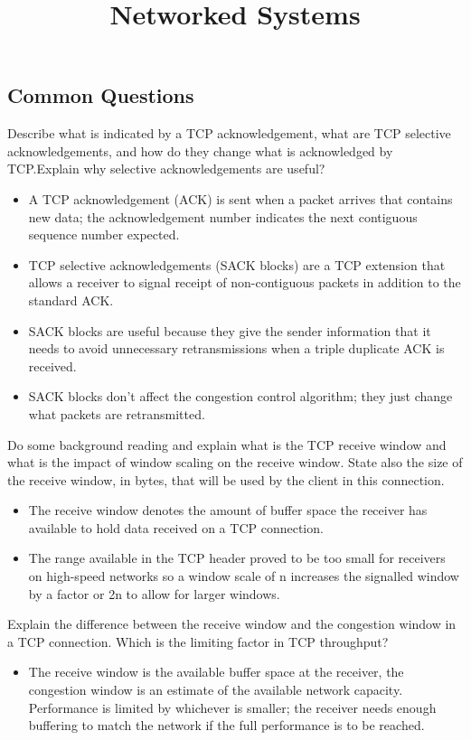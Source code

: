 \documentclass{article}
\title{Networked Systems}
\author{}
\date{}
\begin{document}
\footnotesize

\subsection*{Common Questions}
Describe what is indicated by a TCP acknowledgement, what are TCP selective acknowledgements, and how do they change what is acknowledged by TCP.\@ Explain why selective acknowledgements are useful?
\begin{itemize}
    \item A TCP acknowledgement (ACK) is sent when a packet arrives that contains new data; the acknowledgement number indicates the next contiguous sequence number expected.
    \item TCP selective acknowledgements (SACK blocks) are a TCP extension that allows a receiver to signal receipt of non-contiguous packets in addition to the standard ACK.\@
    \item SACK blocks are useful because they give the sender information that it needs to avoid unnecessary retransmissions when a triple duplicate ACK is received.
    \item SACK blocks don’t affect the congestion control algorithm; they just change what packets are retransmitted.
\end{itemize}

\noindent Do some background reading and explain what is the TCP receive window and what is the impact of window scaling on the receive window. State also the size of the receive window, in bytes, that will be used by the client in this connection.
\begin{itemize}
    \item The receive window denotes the amount of buffer space the receiver has available to hold data received on a TCP connection.
    \item The range available in the TCP header proved to be too small for receivers on high-speed networks so a window scale of n increases the signalled window by a factor or 2n to allow for larger windows.
\end{itemize}

\noindent Explain the difference between the receive window and the congestion window in a TCP connection. Which is the limiting factor in TCP throughput?
\begin{itemize}
    \item The receive window is the available buffer space at the receiver, the congestion window is an estimate of the available network capacity.
    Performance is limited by whichever is smaller; the receiver needs enough buffering to match the network if the full performance is to be reached.
\end{itemize}
\end{document}

